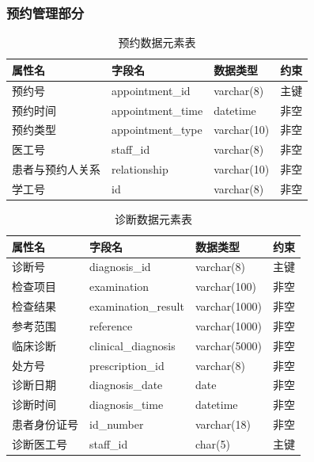 \documentclass{article}
\begin{document}
\subsubsection{预约管理部分}

\begin{table}[H]
    \centering
    \begin{tabularx}{\textwidth}{|>{\raggedright\arraybackslash}X|>{\raggedright\arraybackslash}X|>{\raggedright\arraybackslash}X|>{\raggedright\arraybackslash}X|}
    \toprule
    \textbf{属性名} & \textbf{字段名} & \textbf{数据类型} & \textbf{约束} \\ \midrule
    预约号 & appointment\_id & varchar(8) & 主键 \\ \midrule
    预约时间 & appointment\_time & datetime & 非空 \\ \midrule
    预约类型 & appointment\_type & varchar(10) & 非空 \\ \midrule
    医工号 & staff\_id & varchar(8) & 非空 \\ \midrule
    患者与预约人关系 & relationship & varchar(10) & 非空 \\ \midrule
    学工号 & id & varchar(8) & 非空 \\ \bottomrule
    \end{tabularx}
    \caption{预约数据元素表}
    \label{tab:appointment_elements}
\end{table}

\begin{table}[H]
    \centering
    \begin{tabularx}{\textwidth}{|>{\raggedright\arraybackslash}X|>{\raggedright\arraybackslash}X|>{\raggedright\arraybackslash}X|>{\raggedright\arraybackslash}X|}
    \toprule
    \textbf{属性名} & \textbf{字段名} & \textbf{数据类型} & \textbf{约束} \\ \midrule
    诊断号 & diagnosis\_id & varchar(8) & 主键 \\ \midrule
    检查项目 & examination & varchar(100) & 非空 \\ \midrule
    检查结果 & examination\_result & varchar(1000) & 非空 \\ \midrule
    参考范围 & reference & varchar(1000) & 非空 \\ \midrule
    临床诊断 & clinical\_diagnosis & varchar(5000) & 非空 \\ \midrule
    处方号 & prescription\_id & varchar(8) & 非空 \\ \midrule
    诊断日期 & diagnosis\_date & date & 非空 \\ \midrule
    诊断时间 & diagnosis\_time & datetime & 非空 \\ \midrule
    患者身份证号 & id\_number & varchar(18) & 非空 \\ \midrule
    诊断医工号 & staff\_id & char(5) & 主键 \\ \bottomrule
    \end{tabularx}
    \caption{诊断数据元素表}
    \label{tab:diagnosis_elements}
\end{table}
\end{document}
